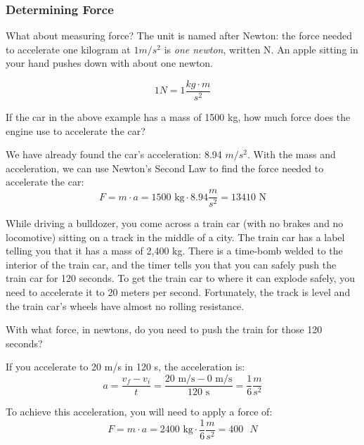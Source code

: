 \subsubsection{Determining Force}
What about measuring force? The unit is named after Newton: the
force needed to accelerate one kilogram at $1 m/s^2$ is \textit{one
newton}, written N. An apple sitting in your hand pushes down with about one newton.

$$1 N = 1 \frac{kg \cdot m}{s^2}$$

\begin{Worked}
\begin{Problem}
If the car in the above example has a mass of 1500 kg, how much 
force does the engine use to accelerate the car?
\end{Problem}
\begin{Solution}
We have already found the car's acceleration: 8.94 $m/s^2$. 
With the mass and acceleration, we can use Newton's Second Law to find the force 
needed to accelerate the car:
$$F = m \cdot a = 1500\text{ kg} \cdot 8.94 \frac{m}{s^2} = 13410\text{ N}$$
\end{Solution}
\end{Worked}

\begin{Exercise}[title={Acceleration}, label=acceleration_train]

While driving a bulldozer, you come across a train car (with no brakes
and no locomotive) sitting on a track in the middle of a city. The train car
has a label telling you that it has a mass of 2,400 kg. There is a time-bomb
welded to the interior of the train car, and the timer tells you that
you can safely push the train car for 120 seconds. To get the train
car to where it can explode safely, you need to accelerate it to 20 meters per
second. Fortunately, the track is level and the train car's wheels have
almost no rolling resistance.

With what force, in newtons, do you need to push the train for those 120 seconds?

\end{Exercise}
\begin{Answer}[ref=acceleration_train]
If you accelerate to 20 m/s in 120 s, the acceleration is:
$$a = \frac{v_f - v_i}{t} = \frac{20\text{ m/s} - 0\text{ m/s}}{120\text{ s}} = 
\frac{1}{6} \frac{m}{s^2}$$

To achieve this acceleration, you will need to apply a force of:
$$F = m \cdot a = 2400\text{ kg} \cdot \frac{1}{6} \frac{m}{s^2} = 400\text{ }N$$
\end{Answer}

